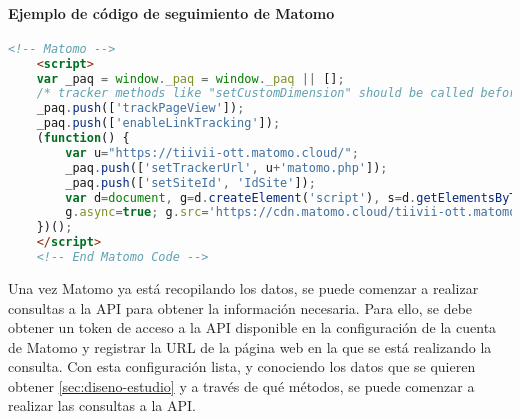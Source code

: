 \paragraph{Ejemplo de código de seguimiento de Matomo}

\begin{lstlisting}[language=HTML]
    <!-- Matomo -->
    <script>
    var _paq = window._paq = window._paq || [];
    /* tracker methods like "setCustomDimension" should be called before "trackPageView" */
    _paq.push(['trackPageView']);
    _paq.push(['enableLinkTracking']);
    (function() {
        var u="https://tiivii-ott.matomo.cloud/";
        _paq.push(['setTrackerUrl', u+'matomo.php']);
        _paq.push(['setSiteId', 'IdSite']);
        var d=document, g=d.createElement('script'), s=d.getElementsByTagName('script')[0];
        g.async=true; g.src='https://cdn.matomo.cloud/tiivii-ott.matomo.cloud/matomo.js'; s.parentNode.insertBefore(g,s);
    })();
    </script>
    <!-- End Matomo Code -->
\end{lstlisting}

Una vez Matomo ya está recopilando los datos, se puede comenzar a realizar consultas a la API para obtener la información
necesaria. Para ello, se debe obtener un token de acceso a la API disponible en la configuración de la cuenta de Matomo y 
registrar la URL de la página web en la que se está realizando la consulta. Con esta configuración lista, y conociendo los
datos que se quieren obtener \ref{sec:diseno-estudio} y a través de qué métodos, se puede comenzar a realizar las consultas 
a la API. 
